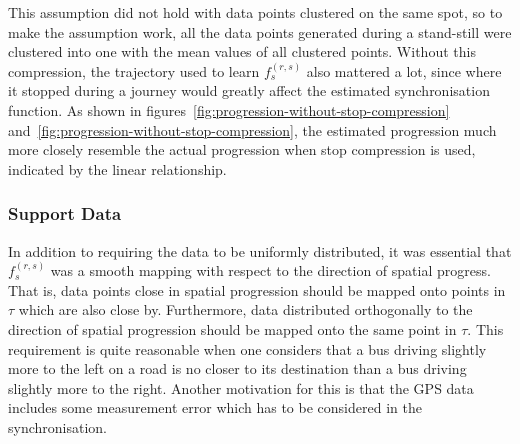 \noindent
This assumption did not hold with data points clustered on the same spot, so to make the assumption work, all the data points generated during a stand-still were clustered into one with the mean values of all clustered points. Without this compression, the trajectory used to learn $f^{(r,s)}_s$ also mattered a lot, since where it stopped during a journey would greatly affect the estimated synchronisation function. As shown in figures~\ref{fig:progression-without-stop-compression} and~\ref{fig:progression-without-stop-compression}, the estimated progression much more closely resemble the actual progression when stop compression is used, indicated by the linear relationship.

\subsubsection{Support Data}
In addition to requiring the data to be uniformly distributed, it was essential that $f^{(r,s)}_s$ was a smooth mapping with respect to the direction of spatial progress. That is, data points close in spatial progression should be mapped onto points in $\tau$ which are also close by. Furthermore, data distributed orthogonally to the direction of spatial progression should be mapped onto the same point in $\tau$. This requirement is quite reasonable when one considers that a bus driving slightly more to the left on a road is no closer to its destination than a bus driving slightly more to the right. Another motivation for this is that the GPS data includes some measurement error which has to be considered in the synchronisation.

